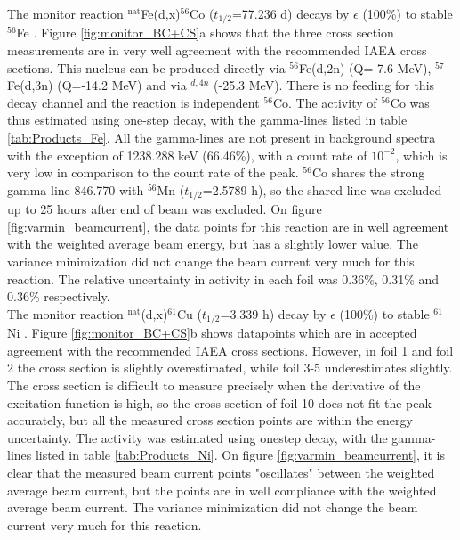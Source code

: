 \noindent
The monitor reaction  $^\text{nat}$Fe(d,x)$^{56}$Co ($t_{1/2}$=77.236 d) decays by $\epsilon$ (100\%) to stable $^{56}$Fe \cite{Junde2011}. Figure \ref{fig:monitor_BC+CS}a shows that the three cross section measurements are in very well agreement with the recommended IAEA cross sections. This nucleus can be produced directly via $^{56}$Fe(d,2n) (Q=-7.6 MeV), $^{57}$Fe(d,3n) (Q=-14.2 MeV) and via $^{d,4n}$ (-25.3 MeV). There is no feeding for this decay channel and the reaction is independent $^{56}$Co. The activity of $^{56}$Co was thus estimated using one-step decay, with the gamma-lines listed in table \ref{tab:Products_Fe}. All the gamma-lines are not present in background spectra with the exception of 1238.288 keV (66.46\%), with a count rate of $10^{-2}$, which is very low in comparison to the count rate of the peak. $^{56}$Co shares the strong gamma-line 846.770 with $^{56}$Mn ($t_{1/2}$=2.5789 h), so the shared line was excluded up to 25 hours after end of beam was excluded. On figure \ref{fig:varmin_beamcurrent}, the data points for this reaction are in well agreement with the weighted average beam energy, but has a slightly lower value. The variance minimization did not change the beam current very much for this reaction. The relative uncertainty in activity in each foil was 0.36\%, 0.31\% and 0.36\% respectively.    \\

\noindent 
The monitor reaction $^\text{nat}$(d,x)$^{61}$Cu ($t_{1/2}$=3.339 h) decay by $\epsilon$ (100\%) to stable $^{61}$Ni \cite{Zuber2015}. Figure \ref{fig:monitor_BC+CS}b shows datapoints which are in accepted agreement with the recommended IAEA cross sections. However, in foil 1 and foil 2 the cross section is slightly overestimated, while foil 3-5 underestimates slightly. The cross section is difficult to measure precisely when the derivative of the excitation function is high, so the cross section of foil 10 does not fit the peak accurately, but all the measured cross section points are within the energy uncertainty. The activity was estimated using onestep decay, with the gamma-lines listed in table \ref{tab:Products_Ni}. On figure \ref{fig:varmin_beamcurrent}, it is clear that the measured beam current points "oscillates" between the weighted average beam current, but the points are in well compliance with the weighted average beam current. The variance minimization did not change the beam current very much for this reaction. \\

